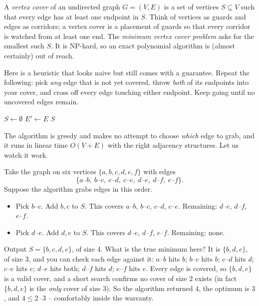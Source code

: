 A \emph{vertex cover} of an undirected graph $G=(V,E)$ is a set of vertices
$S \subseteq V$ such that every edge has at least one endpoint in $S$. Think
of vertices as guards and edges as corridors; a vertex cover is a placement
of guards so that every corridor is watched from at least one end. The
\emph{minimum vertex cover problem} asks for the smallest such $S$. It is
NP-hard, so an exact polynomial algorithm is (almost certainly) out of reach.

Here is a heuristic that looks naive but still comes with a guarantee. Repeat the following: pick \emph{any}
edge that is not yet covered, throw \emph{both} of its endpoints into your
cover, and cross off every edge touching either endpoint. Keep going until no
uncovered edges remain.

\begin{algorithm}[H]
\caption{\textsc{Approx-Vertex-Cover}$(G)$}
$S \gets \emptyset$\;
$E' \gets E$ 
\Return $S$\;
\end{algorithm}

The algorithm is greedy and makes no attempt to choose \emph{which} edge to
grab, and it runs in linear
time $O(V+E)$ with the right adjacency structures. Let us watch it work.

\begin{example}
\label{ch34:vc-trace}
Take the graph on six vertices $\{a,b,c,d,e,f\}$ with edges
\[
\{a\text{--}b,\ b\text{--}c,\ c\text{--}d,\ c\text{--}e,\ d\text{--}e,\
d\text{--}f,\ e\text{--}f\}.
\]
Suppose the algorithm grabs edges in this order.
\begin{itemize}
\item Pick $b\text{--}c$. Add $b,c$ to $S$. This covers $a\text{--}b$,
$b\text{--}c$, $c\text{--}d$, $c\text{--}e$. Remaining: $d\text{--}e$,
$d\text{--}f$, $e\text{--}f$.
\item Pick $d\text{--}e$. Add $d,e$ to $S$. This covers $d\text{--}e$,
$d\text{--}f$, $e\text{--}f$. Remaining: none.
\end{itemize}
Output $S=\{b,c,d,e\}$, of size $4$. What is the true minimum here? It is
$\{b,d,e\}$, of size $3$, and you can check each edge against it: $a\text{--}b$
hits $b$; $b\text{--}c$ hits $b$; $c\text{--}d$ hits $d$; $c\text{--}e$ hits
$e$; $d\text{--}e$ hits both; $d\text{--}f$ hits $d$; $e\text{--}f$ hits $e$.
Every edge is covered, so $\{b,d,e\}$ is a valid cover, and a short search
confirms no cover of size $2$ exists (in fact $\{b,d,e\}$ is the \emph{only}
cover of size $3$). So the algorithm returned $4$, the optimum is $3$, and
$4 \le 2\cdot 3$ -- comfortably inside the warranty.
\end{example}


